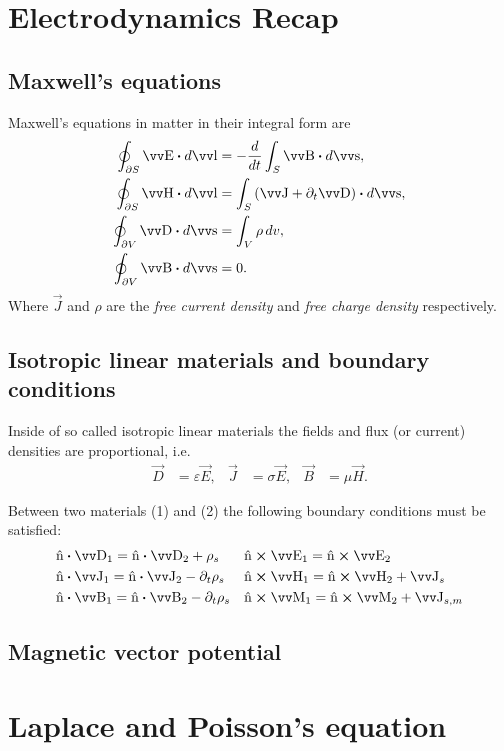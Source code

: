 \documentclass[margin=normal]{tex/hsrzf}
\theoremstyle{elmagzf}
\begin{document}
\section{Electrodynamics Recap}

\subsection{Maxwell's equations}

Maxwell's equations in matter in their integral form are
\begin{subequations}
  \begin{align}
    \oint_{\partial S} \vec{E} \dotp d\vec{l} &= -\frac{d}{dt} \int_S \vec{B} \dotp d\vec{s}, \\
    \oint_{\partial S} \vec{H} \dotp d\vec{l} &= \int_S \left(
      \vec{J} + \partial_t \vec{D}
    \right) \dotp d\vec{s}, \\
    \oint_{\partial V} \vec{D} \dotp d\vec{s} &= \int_V \rho \,dv, \\
    \oint_{\partial V} \vec{B} \dotp d\vec{s} &= 0.
  \end{align}
\end{subequations}
Where \(\vec{J}\) and \(\rho\) are the \emph{free current density} and
\emph{free charge density} respectively.

\subsection{Isotropic linear materials and boundary conditions}

Inside of so called isotropic linear materials the fields and flux (or current)
densities are proportional, i.e.
\begin{align*}
  \vec{D} &= \varepsilon \vec{E}, & \vec{J} &= \sigma \vec{E}, & \vec{B} &= \mu \vec{H}.
\end{align*}

Between two materials (1) and (2) the following boundary conditions must be satisfied:
\begin{align*}
  &\uvec{n} \dotp \vec{D}_1 = \uvec{n} \dotp \vec{D}_2 + \rho_s &
    &\uvec{n} \crossp \vec{E}_1 = \uvec{n} \crossp \vec{E}_2 \\
  &\uvec{n} \dotp \vec{J}_1 = \uvec{n} \dotp \vec{J}_2 - \partial_t \rho_s &
    &\uvec{n} \crossp \vec{H}_1 = \uvec{n} \crossp \vec{H}_2 + \vec{J}_s \\
  &\uvec{n} \dotp \vec{B}_1 = \uvec{n} \dotp \vec{B}_2 - \partial_t \rho_s &
    &\uvec{n} \crossp \vec{M}_1 = \uvec{n} \crossp \vec{M}_2 + \vec{J}_{s,m}
\end{align*}

\subsection{Magnetic vector potential}

\section{Laplace and Poisson's equation}
\end{document}
